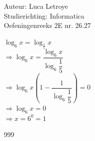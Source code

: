 \documentclass[a4paper]{article}
\begin{document}
  
\noindent \large Auteur: Luca Letroye        \\
\noindent \large Studierichting: Informatica \\
\noindent \large Oefeningenreeks 2E nr. 26.27\\

\medskip

\normalsize

$\log_6x = \log_{\tfrac{1}{5}}x$\\

$\Rightarrow \log_6x = \dfrac{\log_6x}{\log_6\dfrac{1}{5}}$\\

$\Rightarrow \log_6x\left(1-\dfrac{1}{\log_6\dfrac{1}{5}}\right) = 0$\\

$\Rightarrow \log_6x = 0$\\

$\Rightarrow x = 6^0 = 1$\\


\begin{thebibliography}{999}
\end{thebibliography}
\end{document}
